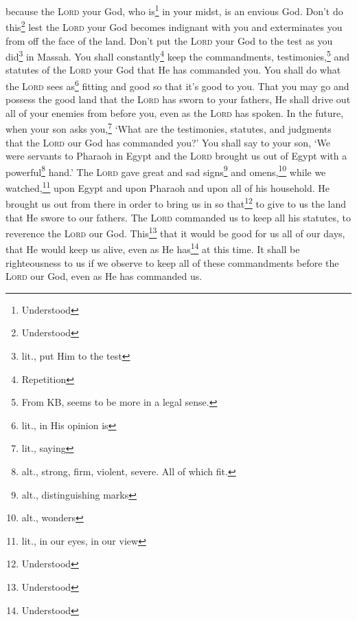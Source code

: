 \begin{inparaenum}
     because the \textsc{Lord} your God, who is\footnote{Understood} in your midst, is an envious God. Don't do this\footnote{Understood} lest the \textsc{Lord} your God becomes indignant with you and exterminates you from off the face of the land.%
     Don't put the \textsc{Lord} your God to the test as you did\footnote{lit., put Him to the test} in Massah.%
     You shall constantly\footnote{Repetition} keep the commandments, testimonies,\footnote{From KB, seems to be more in a legal sense.} and statutes of the \textsc{Lord} your God that He has commanded you.%
     You shall do what the \textsc{Lord} sees as\footnote{lit., in His opinion is} fitting and good so that it's good to you. That you may go and possess the good land that the \textsc{Lord} has sworn to your fathers,%
     He shall drive out all of your enemies from before you, even as the \textsc{Lord} has spoken.%
     In the future, when your son asks you,\footnote{lit., saying} `What are the testimonies, statutes, and judgments that the \textsc{Lord} our God has commanded you?'%
     You shall say to your son, `We were servants to Pharaoh in Egypt and the \textsc{Lord} brought us out of Egypt with a powerful\footnote{alt., strong, firm, violent, severe. All of which fit.} hand.'%
     The \textsc{Lord} gave great and sad signs\footnote{alt., distinguishing marks} and omens,\footnote{alt., wonders} while we watched,\footnote{lit., in our eyes, in our view} upon Egypt and upon Pharaoh and upon all of his household.%
     He brought us out from there in order to bring us in so that\footnote{Understood} to give to us the land that He swore to our fathers.%
     The \textsc{Lord} commanded us to keep all his statutes, to reverence the \textsc{Lord} our God. This\footnote{Understood} that it would be good for us all of our days, that He would keep us alive, even as He has\footnote{Understood} at this time.%
     It shall be righteousness to us if we observe to keep all of these commandments before the \textsc{Lord} our God, even as He has commanded us.%
\end{inparaenum}
